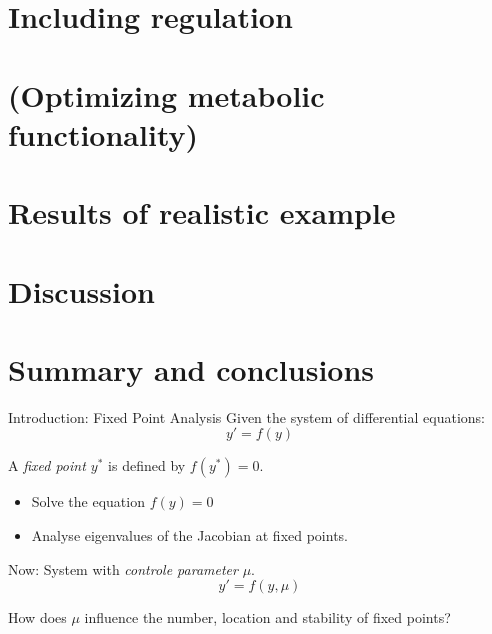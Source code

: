 \documentclass{beamer}
\begin{document}
\section{Including regulation}


\section{(Optimizing metabolic functionality)}


\section{Results of realistic example}


\section{Discussion}


\section{Summary and conclusions}

\begin{frame}{Introduction: Fixed Point Analysis}
    Given the system of differential equations:
    $$y' = f(y) $$
    \begin{definition}
        A \emph{fixed point $y^*$} is defined by $f(y^*)=0$.
    \end{definition}
    \begin{itemize}
        \item Solve the equation $f(y) = 0$ 
        \item Analyse eigenvalues of the Jacobian at fixed points.
    \end{itemize}
    Now: System with \emph{controle parameter} $\mu$. 
    $$y' = f(y, \mu)$${}    
    \begin{block}{}
        How does $\mu$ influence the number, location and stability of fixed points?
    \end{block}
\end{frame}
\end{document}
